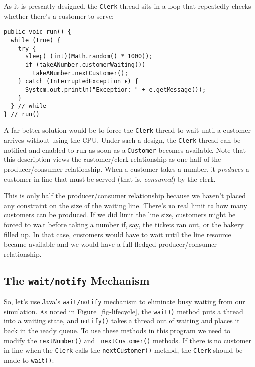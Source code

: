 \pagebreak
As it is presently designed, the {\tt Clerk} thread sits in a loop
that repeatedly checks whether there's a customer to serve:


\begin{jjjlisting}
\begin{lstlisting}
public void run() {
  while (true) {
    try {
      sleep( (int)(Math.random() * 1000));
      if (takeANumber.customerWaiting())
        takeANumber.nextCustomer();
    } catch (InterruptedException e) {
      System.out.println("Exception: " + e.getMessage());
    }
  } // while
} // run()
\end{lstlisting}
\end{jjjlisting}

A far better solution would be to force the {\tt Clerk} thread to wait
until a customer arrives without using the CPU.  Under such a design,
the {\tt Clerk} thread can be notified and enabled to run as
soon as a {\tt Customer} becomes available.  Note that
this description views the customer/clerk relationship as one-half of
the producer/consumer
 relationship.  When a customer takes a
number, it {\it produces} a customer in line that must be served (that
is, {\it consumed}) by the clerk.

This is only half the producer/consumer relationship because we
haven't placed any constraint on the size of the waiting line.  There's
no real limit to how many customers  can be produced.   If we
did limit the line size, customers might be forced to wait before
taking a number if, say, the tickets ran out, or the bakery filled up.
In that case, customers would have to wait until the line resource
became available and we would have a full-fledged producer/consumer
relationship.

\subsection*{The {\tt wait/notify} Mechanism}
\noindent So, let's use Java's {\tt wait/notify} mechanism to
eliminate busy waiting from our simulation.  As noted in
Figure~\ref{fig-lifecycle}, the {\tt wait()} method puts a thread into
a waiting state, and {\tt notify()} takes a thread out of waiting and
places it back in the ready queue.  To use these methods in this
program we need to modify the {\tt nextNumber()} and {\tt
nextCustomer()} methods.  If there is no customer in line when the
{\tt Clerk} calls the {\tt nextCustomer()} method, the {\tt Clerk}
should be made to {\tt wait()}:

